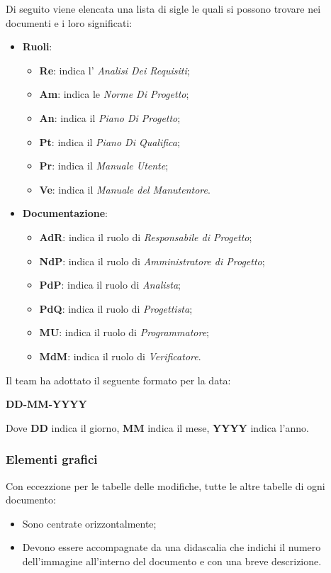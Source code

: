 Di seguito viene elencata una lista di sigle le quali si possono trovare nei documenti e i loro significati:
\begin {itemize}
\item \textbf{Ruoli}:
	\begin {itemize}
	\item \textbf{Re}: indica l' \textit{Analisi Dei Requisiti};
	\item \textbf{Am}: indica le \textit{Norme Di Progetto};
	\item \textbf{An}: indica il \textit{Piano Di Progetto};
	\item \textbf{Pt}: indica il \textit{Piano Di Qualifica};
	\item \textbf{Pr}: indica il \textit{Manuale Utente};
	\item \textbf{Ve}: indica il \textit{Manuale del Manutentore}.
	\end {itemize}
\item \textbf{Documentazione}:
	\begin {itemize}
	\item \textbf{AdR}: indica il ruolo di \textit{Responsabile di Progetto};
	\item \textbf{NdP}: indica il ruolo di \textit{Amministratore di Progetto};
	\item \textbf{PdP}: indica il ruolo di \textit{Analista};
	\item \textbf{PdQ}: indica il ruolo di \textit{Progettista};
	\item \textbf{MU}: indica il ruolo di \textit{Programmatore};
	\item \textbf{MdM}: indica il ruolo di \textit{Verificatore}.
	\end {itemize}
\end {itemize}
Il team ha adottato il seguente formato per la data:
\begin{center}
    \large{\textbf{DD-MM-YYYY}}
\end{center}
Dove \textbf{DD} indica il giorno, \textbf{MM} indica il mese, \textbf{YYYY} indica l'anno.

\subsubsection{Elementi grafici}

Con eccezzione per le tabelle delle modifiche, tutte le altre tabelle di ogni documento:
\begin {itemize}
\item Sono centrate orizzontalmente;
\item Devono essere accompagnate da una didascalia che indichi il numero dell'immagine all'interno del documento e con una breve descrizione.
\end {itemize}

